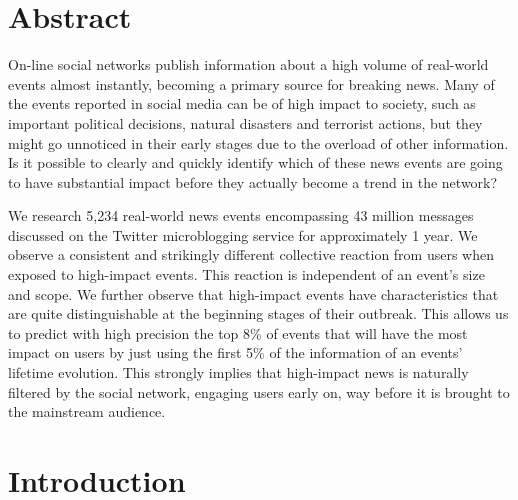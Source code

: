 \documentclass[10pt,letterpaper]{article}
\begin{document}
\section*{Abstract}

On-line social networks publish information about a high volume of
real-world events almost instantly, becoming a primary source for
breaking news.  Many of the events reported in social media can be of
high impact to society, such as important political decisions, natural
disasters and terrorist actions, but they might go unnoticed in their
early stages due to the overload of other information.  Is it possible
to clearly and quickly identify which of these news events are going
to have substantial impact before they actually become a trend in the
network?

We research 5,234 real-world news events encompassing 43 million
messages discussed on the Twitter microblogging service for
approximately 1 year.
%
We observe a consistent and strikingly different collective reaction
from users when exposed to high-impact events.  This reaction is
independent of an event's size and scope.  We further observe that
high-impact events have characteristics that are quite distinguishable
at the beginning stages of their outbreak.  This allows us to predict
with high precision the top 8\% of events that will have the most
impact on users by just using the first 5\% of the information of an
events' lifetime evolution.  This strongly implies that high-impact
news is naturally filtered by the social network, engaging users early
on, way before it is brought to the mainstream audience.

\linenumbers

\section*{Introduction}
\end{document}
